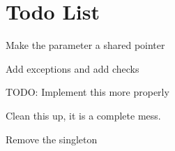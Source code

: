 \chapter{Todo List}
\hypertarget{todo}{}\label{todo}

\begin{DoxyRefList}
\item[Member \doxylink{class_atlas_1_1_component_a995c7391052db9cd22716846e0735b71}{Atlas\+::Component\+::set\+Owner} (\doxylink{class_atlas_1_1_i_game_object}{IGame\+Object} \texorpdfstring{$\ast$}{*}owner)]\label{todo__todo000001}%
%
Make the parameter a shared pointer 



Add exceptions and add checks  
\item[Member \doxylink{namespace_atlas_a2fb14e6c76bf6e577bdd65ffff7d7519}{Atlas\+::Default\+Physics\+Trace} (const char \texorpdfstring{$\ast$}{*}in\+FMT,...)]\label{todo__todo000014}%
%
TODO\+: Implement this more properly  
\item[Class \doxylink{class_atlas_1_1_file_system_registry}{Atlas\+::File\+System\+Registry} ]\label{todo__todo000006}%
%
Clean this up, it is a complete mess. 



Remove the singleton 




\end{DoxyRefList}
